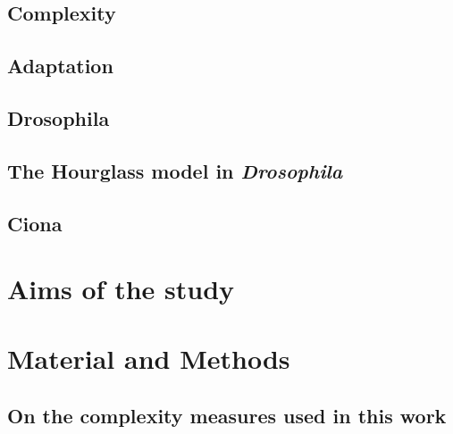 \documentclass[officiallayout]{tktla_modified}
\begin{document}
%	
	
%	
\section{Complexity}
	
\section{Adaptation}
	
\section{Drosophila}
	
\section{The Hourglass model in \textit{Drosophila} }
	
\section{Ciona}
	
	\clearpage

\chapter{Aims of the study}



\chapter{Material and Methods}
	\section{On the complexity measures used in this work}
	
\end{document}

